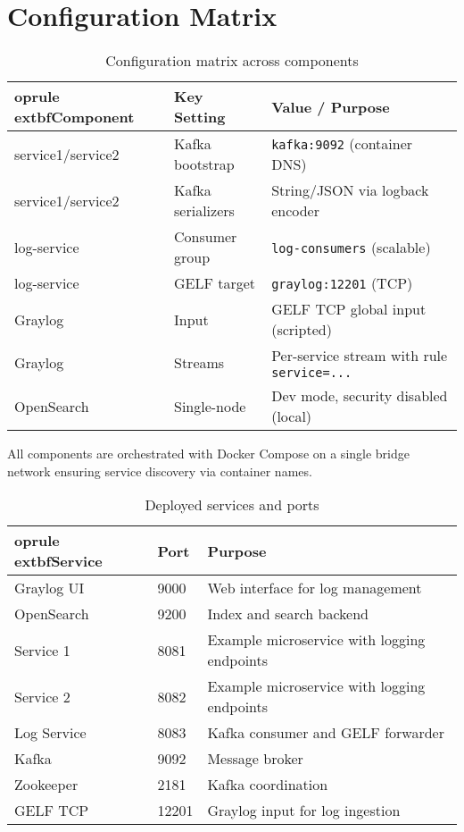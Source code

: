\documentclass[12pt,a4paper]{report}
\begin{document}
\section{Configuration Matrix}
\begin{table}[H]
\centering
\begin{tabular}{p{4cm} p{4cm} p{7cm}}
	oprule
	extbf{Component} & \textbf{Key Setting} & \textbf{Value / Purpose} \\
\midrule
service1/service2 & Kafka bootstrap & \texttt{kafka:9092} (container DNS) \\
service1/service2 & Kafka serializers & String/JSON via logback encoder \\
log-service & Consumer group & \texttt{log-consumers} (scalable) \\
log-service & GELF target & \texttt{graylog:12201} (TCP) \\
Graylog & Input & GELF TCP global input (scripted) \\
Graylog & Streams & Per-service stream with rule \texttt{service=...} \\
OpenSearch & Single-node & Dev mode, security disabled (local) \\
\bottomrule
\end{tabular}
\caption{Configuration matrix across components}
\end{table}
All components are orchestrated with Docker Compose on a single bridge network ensuring service discovery via container names.

\begin{table}[H]
\centering
\begin{tabular}{llp{7cm}}
	oprule
	extbf{Service} & \textbf{Port} & \textbf{Purpose} \\
\midrule
Graylog UI & 9000 & Web interface for log management \\
OpenSearch & 9200 & Index and search backend \\
Service 1 & 8081 & Example microservice with logging endpoints \\
Service 2 & 8082 & Example microservice with logging endpoints \\
Log Service & 8083 & Kafka consumer and GELF forwarder \\
Kafka & 9092 & Message broker \\
Zookeeper & 2181 & Kafka coordination \\
GELF TCP & 12201 & Graylog input for log ingestion \\
\bottomrule
\end{tabular}
\caption{Deployed services and ports}
\end{table}
\end{document}
